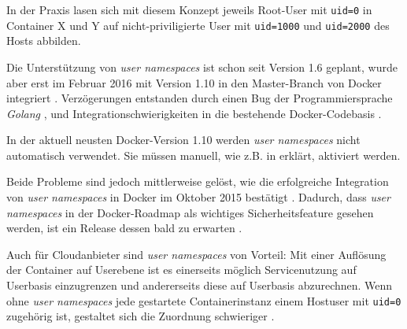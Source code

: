 \documentclass[../main.tex]{subfiles}
\begin{document}
			In der Praxis lasen sich mit diesem Konzept jeweils Root-User mit \texttt{uid=0} in Container X und Y auf nicht-priviligierte User mit \texttt{uid=1000} und \texttt{uid=2000} des Hosts abbilden.


			Die Unterstützung von \emph{user namespaces} ist schon seit Version 1.6 geplant, wurde aber erst im Februar 2016 mit Version 1.10 in den Master-Branch von Docker integriert \cite{githubDockerChangelog}\cite{githubUserNamespaceProposal}. Verzögerungen entstanden durch einen Bug der Programmiersprache \emph{Golang} \cite{nsUserGolangBug}, und Integrationschwierigkeiten in die bestehende Docker-Codebasis \cite{githubUserNamespaceConflict}.

			In der aktuell neusten Docker-Version 1.10 werden \emph{user namespaces} nicht automatisch verwendet. Sie müssen manuell, wie z.B. in \cite{nsUserEnable} erklärt, aktiviert werden.


			Beide Probleme sind jedoch mittlerweise gelöst, wie die erfolgreiche Integration von \emph{user namespaces} in Docker im Oktober 2015 bestätigt \cite{githubUserNamespaceIntegration}. Dadurch, dass \emph{user namespaces} in der Docker-Roadmap als wichtiges Sicherheitsfeature gesehen werden, ist ein Release dessen bald zu erwarten \cite{githubDockerRoadmap}.




			Auch für Cloudanbieter sind \emph{user namespaces} von Vorteil: Mit einer Auflösung der Container auf Userebene ist es einerseits möglich Servicenutzung auf Userbasis einzugrenzen und andererseits diese auf Userbasis abzurechnen. Wenn ohne \emph{user namespaces} jede gestartete Containerinstanz einem Hostuser mit \texttt{uid=0} zugehörig ist, gestaltet sich die Zuordnung schwieriger \cite[S.3]{nsUserContainerCon}.
\end{document}
